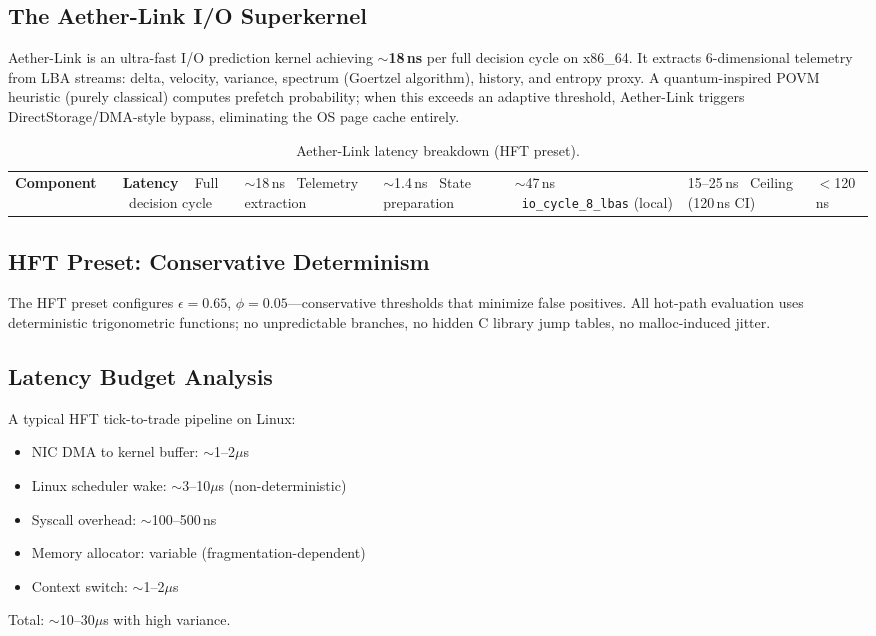 \documentclass[11pt, a4paper]{article}
\theoremstyle{proofform}
\numberwithin{innerpoints}{subsection}
\numberwithin{disproof}{subsection}
\theoremstyle{mathproof}
\begin{document}
\subsection{The Aether-Link I/O Superkernel}

Aether-Link is an ultra-fast I/O prediction kernel achieving \textbf{$\sim$18\,ns} per full decision cycle on x86\_64. It extracts 6-dimensional telemetry from LBA streams: delta, velocity, variance, spectrum (Goertzel algorithm), history, and entropy proxy. A quantum-inspired POVM heuristic (purely classical) computes prefetch probability; when this exceeds an adaptive threshold, Aether-Link triggers DirectStorage/DMA-style bypass, eliminating the OS page cache entirely.

\begin{table}[h!]
\centering
\caption{Aether-Link latency breakdown (HFT preset).}
\label{tab:aether}
\begin{tabular}{l|c}
\toprule
\textbf{Component} & \textbf{Latency} \
\midrule
Full decision cycle & $\sim$18\,ns \
Telemetry extraction & $\sim$1.4\,ns \
State preparation & $\sim$47\,ns \
\texttt{io\_cycle\_8\_lbas} (local) & 15--25\,ns \
Ceiling (120\,ns CI) & $<$120\,ns \
\bottomrule
\end{tabular}
\end{table}

\subsection{HFT Preset: Conservative Determinism}

The HFT preset configures $\epsilon = 0.65$, $\phi = 0.05$---conservative thresholds that minimize false positives. All hot-path evaluation uses deterministic trigonometric functions; no unpredictable branches, no hidden C library jump tables, no malloc-induced jitter.

\subsection{Latency Budget Analysis}

A typical HFT tick-to-trade pipeline on Linux:
\begin{itemize}[nosep]
  \item NIC DMA to kernel buffer: $\sim$1--2$\mu$s
  \item Linux scheduler wake: $\sim$3--10$\mu$s (non-deterministic)
  \item Syscall overhead: $\sim$100--500\,ns
  \item Memory allocator: variable (fragmentation-dependent)
  \item Context switch: $\sim$1--2$\mu$s
\end{itemize}
Total: $\sim$10--30$\mu$s with high variance.
\end{document}
